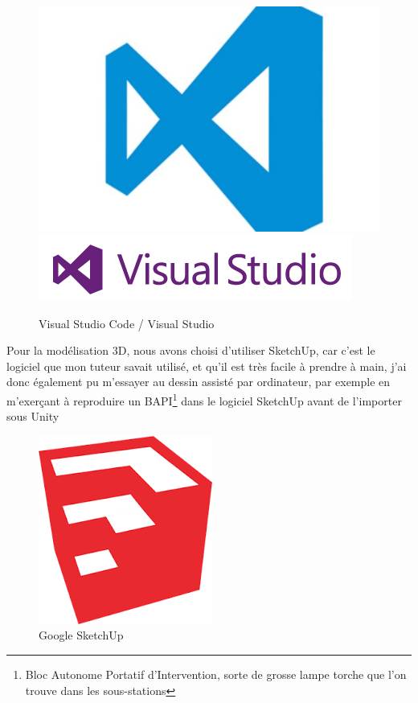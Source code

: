 \documentclass[a4paper]{article}
\begin{document}
    \begin{figure}[H]
        \centering
        \includegraphics[scale=0.05]{img/Logo-VSCode}
        \hspace{10pt}
        \includegraphics[scale=0.5]{img/logo-visual-studio}
        \caption{Visual Studio Code / Visual Studio}
    \end{figure}

    Pour la modélisation 3D, nous avons choisi d'utiliser SketchUp, car c'est le logiciel que mon tuteur savait utilisé, et qu'il est très facile à prendre à main, j'ai donc également pu m'essayer au dessin assisté par ordinateur, par exemple en m'exerçant à reproduire un BAPI\footnote{Bloc Autonome Portatif d'Intervention, sorte de grosse lampe torche que l'on trouve dans les sous-stations} dans le logiciel SketchUp avant de l'importer sous Unity \\

    \begin{figure}[H]
        \centering
        \includegraphics[scale=0.5]{img/logo-skp}
        \caption{Google SketchUp}
    \end{figure}
\end{document}
